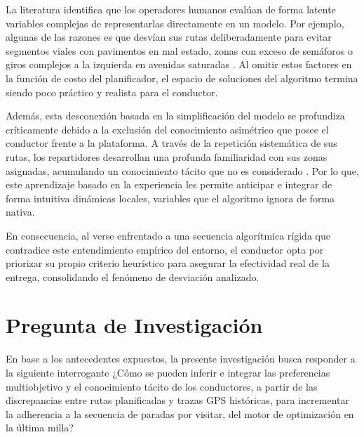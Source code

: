 La literatura identifica que los operadores humanos evalúan de forma latente variables complejas de representarlas directamente en un modelo. Por ejemplo, algunas de las razones es que desvían sus rutas deliberadamente para evitar segmentos viales con pavimentos en mal estado, zonas con exceso de semáforos o giros complejos a la izquierda en avenidas saturadas \cite{zattoni2025inverse, cook2024constrained, yang2015toward, pan2025preference, ceikute2013routing, chen2001using}. Al omitir estos factores en la función de costo del planificador, el espacio de soluciones del algoritmo termina siendo poco práctico y realista para el conductor. 

Además, esta desconexión basada en la simplificación del modelo se profundiza críticamente debido a la exclusión del conocimiento asimétrico que posee el conductor frente a la plataforma. A través de la repetición sistemática de sus rutas, los repartidores desarrollan una profunda familiaridad con sus zonas asignadas, acumulando un conocimiento tácito que no es considerado \cite{merchan20242021, canoy2023learn, ceikute2013routing, ozarik2024machine}. Por lo que, este aprendizaje basado en la experiencia les permite anticipar e integrar de forma intuitiva dinámicas locales, variables que el algoritmo ignora de forma nativa. 

En consecuencia, al verse enfrentado a una secuencia algorítmica rígida que contradice este entendimiento empírico del entorno, el conductor opta por priorizar su propio criterio heurístico para asegurar la efectividad real de la entrega, consolidando el fenómeno de desviación analizado.


\section{Pregunta de Investigación}
En base a los antecedentes expuestos, la presente investigación busca responder a la siguiente interrogante ¿Cómo se pueden inferir e integrar las preferencias multiobjetivo y el conocimiento tácito de los conductores, a partir de las discrepancias entre rutas planificadas y trazas GPS históricas, para incrementar la adherencia a la secuencia de paradas por visitar, del motor de optimización en la última milla?